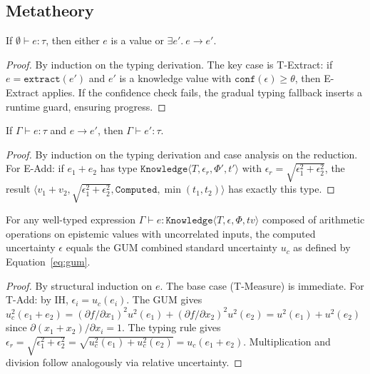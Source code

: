 \documentclass[acmsmall,screen,review,anonymous]{acmart}
\newcommand{\knowfull}[4]{\texttt{Knowledge}\langle #1, #2, #3, #4 \rangle}
\newcommand{\eps}{\epsilon}
\begin{document}
\subsection{Metatheory}

\begin{theorem}[Progress]
If $\emptyset \vdash e : \tau$, then either $e$ is a value or
$\exists e'.\ e \longrightarrow e'$.
\end{theorem}

\begin{proof}
By induction on the typing derivation.
The key case is T-Extract: if $e = \texttt{extract}(e')$
and $e'$ is a knowledge value with $\texttt{conf}(\eps) \geq \theta$,
then E-Extract applies.
If the confidence check fails, the gradual typing fallback
inserts a runtime guard, ensuring progress.
\end{proof}

\begin{theorem}[Preservation]
If $\Gamma \vdash e : \tau$ and $e \longrightarrow e'$,
then $\Gamma \vdash e' : \tau$.
\end{theorem}

\begin{proof}
By induction on the typing derivation and case analysis on
the reduction.
For E-Add: if $e_1 + e_2$ has type $\knowfull{T}{\eps_r}{\Phi'}{t'}$
with $\eps_r = \sqrt{\eps_1^2 + \eps_2^2}$, the result
$\langle v_1{+}v_2, \sqrt{\eps_1^2{+}\eps_2^2}, \texttt{Computed}, \min(t_1,t_2) \rangle$
has exactly this type.
\end{proof}

\begin{theorem}
\label{thm:gum}
For any well-typed expression
$\Gamma \vdash e : \knowfull{T}{\eps}{\Phi}{\mathit{tv}}$
composed of arithmetic operations on epistemic values with uncorrelated
inputs, the computed uncertainty $\eps$ equals the GUM combined standard
uncertainty $u_c$ as defined by Equation~\eqref{eq:gum}.
\end{theorem}

\begin{proof}
By structural induction on $e$.
The base case (T-Measure) is immediate.
For T-Add: by IH, $\eps_i = u_c(e_i)$.
The GUM gives $u_c^2(e_1{+}e_2) = (\partial f/\partial x_1)^2 u^2(e_1)
+ (\partial f/\partial x_2)^2 u^2(e_2) = u^2(e_1) + u^2(e_2)$
since $\partial(x_1{+}x_2)/\partial x_i = 1$.
The typing rule gives $\eps_r = \sqrt{\eps_1^2 + \eps_2^2}
= \sqrt{u_c^2(e_1) + u_c^2(e_2)} = u_c(e_1{+}e_2)$.
Multiplication and division follow analogously via relative uncertainty.
\end{proof}
\end{document}
